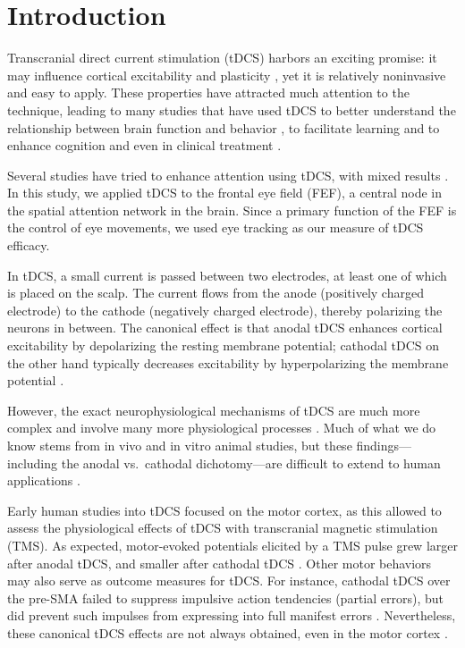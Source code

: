 \documentclass[11pt,english,]{memoir}
\begin{document}
\hypertarget{sacc_tDCS-introduction}{%
\section{Introduction}\label{sacc_tDCS-introduction}}

Transcranial direct current stimulation (tDCS) harbors an exciting promise: it may influence cortical excitability and plasticity \autocite{Yavari2018}, yet it is relatively noninvasive and easy to apply. These properties have attracted much attention to the technique, leading to many studies that have used tDCS to better understand the relationship between brain function and behavior \autocite{Filmer2014}, to facilitate learning and to enhance cognition \autocites{CohenKadosh2014}{Coffman2014} and even in clinical treatment \autocite{Lefaucheur2016}.

Several studies have tried to enhance attention using tDCS, with mixed results \autocite{Reteig2017}. In this study, we applied tDCS to the frontal eye field (FEF), a central node in the spatial attention network in the brain. Since a primary function of the FEF is the control of eye movements, we used eye tracking as our measure of tDCS efficacy.

In tDCS, a small current is passed between two electrodes, at least one of which is placed on the scalp. The current flows from the anode (positively charged electrode) to the cathode (negatively charged electrode), thereby polarizing the neurons in between. The canonical effect is that anodal tDCS enhances cortical excitability by depolarizing the resting membrane potential; cathodal tDCS on the other hand typically decreases excitability by hyperpolarizing the membrane potential \autocite{Nitsche2008}.

However, the exact neurophysiological mechanisms of tDCS are much more complex and involve many more physiological processes \autocites{Medeiros2012}{Jackson2016}. Much of what we do know stems from in vivo and in vitro animal studies, but these findings---including the anodal vs.~cathodal dichotomy---are difficult to extend to human applications \autocites{Fertonani2017}{Bestmann2014}.

Early human studies into tDCS focused on the motor cortex, as this allowed to assess the physiological effects of tDCS with transcranial magnetic stimulation (TMS). As expected, motor-evoked potentials elicited by a TMS pulse grew larger after anodal tDCS, and smaller after cathodal tDCS \autocites{Nitsche2000}{Nitsche2001}. Other motor behaviors may also serve as outcome measures for tDCS. For instance, cathodal tDCS over the pre-SMA failed to suppress impulsive action tendencies (partial errors), but did prevent such impulses from expressing into full manifest errors \autocite{Spieser2015}. Nevertheless, these canonical tDCS effects are not always obtained, even in the motor cortex \autocite{Strube2016}.
\end{document}
